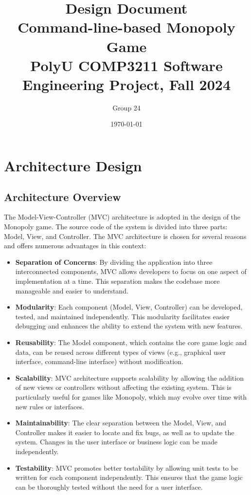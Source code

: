 \documentclass{article}
\title{\textbf{Design Document} \\ {\textbf{Command-line-based Monopoly Game}}\\ {\large PolyU COMP3211 Software Engineering Project, Fall 2024}}
\author{\large Group 24}
\date{\today}
\begin{document}
\maketitle{}

\section{Architecture Design}

\subsection{Architecture Overview}

The Model-View-Controller (MVC) architecture is adopted in the design of the Monopoly game.
The source code of the system is divided into three parts: Model, View, and Controller. 
The MVC architecture is chosen for several reasons and offers numerous advantages in this context:

\begin{itemize}
    \item \textbf{Separation of Concerns}: By dividing the application into three interconnected components, MVC allows developers to focus on one aspect of implementation at a time. This separation makes the codebase more manageable and easier to understand.
    \item \textbf{Modularity}: Each component (Model, View, Controller) can be developed, tested, and maintained independently. This modularity facilitates easier debugging and enhances the ability to extend the system with new features.
    \item \textbf{Reusability}: The Model component, which contains the core game logic and data, can be reused across different types of views (e.g., graphical user interface, command-line interface) without modification.
    \item \textbf{Scalability}: MVC architecture supports scalability by allowing the addition of new views or controllers without affecting the existing system. This is particularly useful for games like Monopoly, which may evolve over time with new rules or interfaces.
    \item \textbf{Maintainability}: The clear separation between the Model, View, and Controller makes it easier to locate and fix bugs, as well as to update the system. Changes in the user interface or business logic can be made independently.
    \item \textbf{Testability}: MVC promotes better testability by allowing unit tests to be written for each component independently. This ensures that the game logic can be thoroughly tested without the need for a user interface.
\end{itemize}
\end{document}
